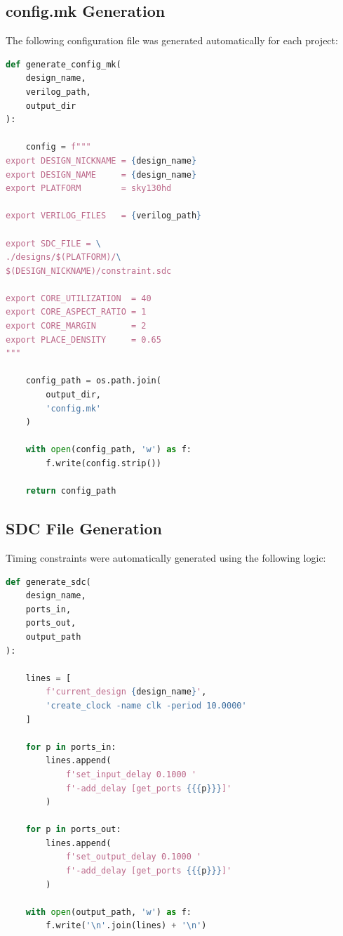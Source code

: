 \subsection{config.mk Generation}

The following configuration file was generated automatically for each project:

\begin{lstlisting}[language=python,
caption={config.mk generation inside OpenROAD.py.}]
def generate_config_mk(
    design_name,
    verilog_path,
    output_dir
):

    config = f"""
export DESIGN_NICKNAME = {design_name}
export DESIGN_NAME     = {design_name}
export PLATFORM        = sky130hd

export VERILOG_FILES   = {verilog_path}

export SDC_FILE = \
./designs/$(PLATFORM)/\
$(DESIGN_NICKNAME)/constraint.sdc

export CORE_UTILIZATION  = 40
export CORE_ASPECT_RATIO = 1
export CORE_MARGIN       = 2
export PLACE_DENSITY     = 0.65
"""

    config_path = os.path.join(
        output_dir,
        'config.mk'
    )

    with open(config_path, 'w') as f:
        f.write(config.strip())

    return config_path
\end{lstlisting}

\subsection{SDC File Generation}

Timing constraints were automatically generated using the following logic:

\begin{lstlisting}[language=python,
caption={Automatic SDC generation.}]
def generate_sdc(
    design_name,
    ports_in,
    ports_out,
    output_path
):

    lines = [
        f'current_design {design_name}',
        'create_clock -name clk -period 10.0000'
    ]

    for p in ports_in:
        lines.append(
            f'set_input_delay 0.1000 '
            f'-add_delay [get_ports {{{p}}}]'
        )

    for p in ports_out:
        lines.append(
            f'set_output_delay 0.1000 '
            f'-add_delay [get_ports {{{p}}}]'
        )

    with open(output_path, 'w') as f:
        f.write('\n'.join(lines) + '\n')
\end{lstlisting}

